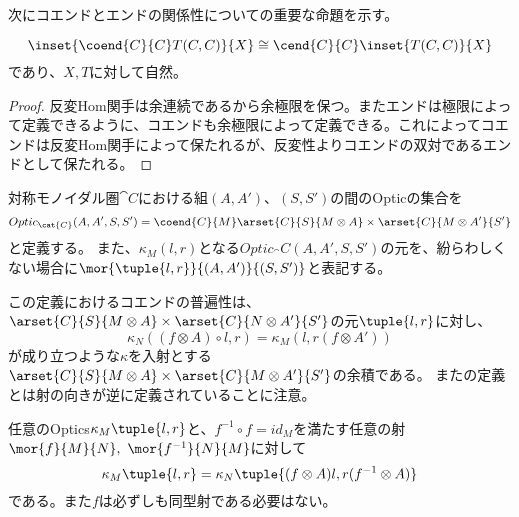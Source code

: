 \documentclass[uplatex,dvipdfmx]{jsarticle}
\begin{document}
  次にコエンドとエンドの関係性についての重要な命題を示す。
  \begin{prop}\label{prop-preservation-coend-by-hom-functor}
    \[\inset{\coend{C}{C} T(C,C)}{X}\cong\cend{C}{C}\inset{T(C,C)}{X}\]であり、$X,T$に対して自然。
  \end{prop}
  \begin{proof}
    反変Hom関手は余連続であるから余極限を保つ。またエンドは極限によって定義できるように、コエンドも余極限によって定義できる。これによってコエンドは反変Hom関手によって保たれるが、反変性よりコエンドの双対であるエンドとして保たれる。
  \end{proof}
  \begin{define}[Optics]\label{def-optics}
    対称モノイダル圏$\cat{C}$における組$(A,A')$、$(S,S')$の間のOpticの集合を
    \[Optic_\cat{C}(A,A',S,S')=\coend{C}{M}\arset{C}{S}{M\otimes A}\times \arset{C}{M\otimes A'}{S'}\]と定義する。
    また、$\kappa_M(l,r)$となる$Optic_\cat{C}(A,A',S,S')$の元を、紛らわしくない場合に$\mor{\tuple{l,r}}{(A,A')}{(S,S')}$と表記する。
    \begin{center}
    \end{center}
  \end{define}
  この定義におけるコエンドの普遍性は、$\arset{C}{S}{M\otimes A}\times \arset{C}{N\otimes A'}{S'}$の元$\tuple{l,r}$に対し、
  \[\kappa_N((f\otimes A)\circ l, r)=\kappa_M(l, r(f\otimes A'))\]が成り立つような$\kappa$を入射とする$\arset{C}{S}{M\otimes A}\times \arset{C}{M\otimes A'}{S'}$の余積である。
  また\cite{categories_of_optics}の定義とは射の向きが逆に定義されていることに注意。
  \begin{prop}
    任意のOptics$\kappa_M\tuple{l,r}$と、$f^{-1}\circ f = id_M$を満たす任意の射$\mor{f}{M}{N},\ \mor{f^{-1}}{N}{M}$に対して\[\kappa_M\tuple{l,r} = \kappa_N\tuple{(f\otimes A)l,r(f^{-1}\otimes A)}\]である。また$f$は必ずしも同型射である必要はない。
  \end{prop}
\end{document}
